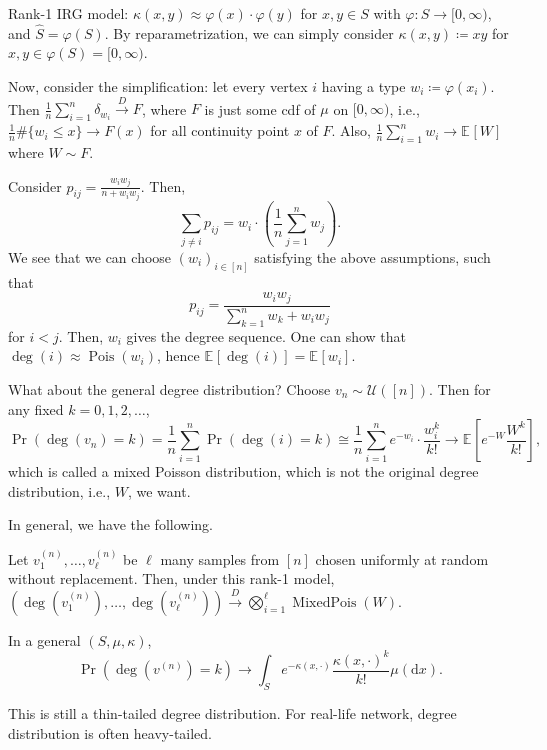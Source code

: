 Rank-1 IRG model: \(\kappa (x, y) \approx \varphi (x) \cdot \varphi (y)\) for \(x, y \in S\) with \(\varphi \colon S \to [0, \infty )\), and \(\hat{S} = \varphi (S)\). By reparametrization, we can simply consider \(\kappa (x, y) \coloneqq xy\) for \(x, y \in \varphi (S) = [0, \infty )\).

Now, consider the simplification: let every vertex \(i\) having a type \(w_i \coloneqq \varphi (x_i)\). Then \(\frac{1}{n}\sum_{i=1}^{n} \delta _{w_i} \overset{D}{\to} F\), where \(F\) is just some cdf of \(\mu \) on \([0, \infty )\), i.e., \(\frac{1}{n}\#\{ w_i \leq x \} \to F(x)\) for all continuity point \(x\) of \(F\). Also, \(\frac{1}{n} \sum_{i=1}^{n} w_i \to \mathbb{E}_{}[W] \) where \(W \sim F\).

Consider \(p_{ij} = \frac{w_i w_j}{n + w_i w_j}\). Then,
\[
	\sum_{j \neq i} p_{ij}
	= w_i \cdot \left( \frac{1}{n}\sum_{j=1}^{n} w_j \right).
\]
We see that we can choose \((w_i)_{i \in [n]}\) satisfying the above assumptions, such that
\[
	p_{ij}
	= \frac{w_i w_j}{\sum_{k=1}^{n} w_k + w_i w_j}
\]
for \(i < j\). Then, \(w_i\) gives the degree sequence. One can show that \(\deg (i) \approx \operatorname{Pois}(w_i) \), hence \(\mathbb{E}_{}[\deg (i)] = \mathbb{E}_{}[w_i] \).

What about the general degree distribution? Choose \(v_n \sim \mathcal{U} ([n])\). Then for any fixed \(k=0, 1, 2, \dots \),
\[
	\Pr_{}\left(\deg (v_n) = k\right)
	= \frac{1}{n} \sum_{i=1}^{n} \Pr_{}\left(\deg (i) = k\right)
	\cong \frac{1}{n} \sum_{i=1}^{n} e^{-w_i} \cdot \frac{w_i^k}{k!}
	\to \mathbb{E}_{}\left[ e^{-W} \frac{W^k}{k!} \right] ,
\]
which is called a mixed Poisson distribution, which is not the original degree distribution, i.e., \(W\), we want.

In general, we have the following.

\begin{theorem}
	Let \(v_1^{(n)}, \dots , v_{\ell }^{(n)} \) be \(\ell \) many samples from \([n]\) chosen uniformly at random without replacement. Then, under this rank-1 model, \((\deg (v_1^{(n)}), \dots , \deg (v_{\ell } ^{(n)})) \overset{D}{\to} \bigotimes _{i=1}^{\ell} \operatorname{MixedPois}(W) \).
\end{theorem}

In a general \((S, \mu , \kappa )\),
\[
	\Pr_{}\left(\deg (v^{(n)}) = k\right)
	\to \int _S e^{-\kappa (x, \cdot)} \frac{\kappa (x, \cdot)^k}{k!} \mu (\mathrm{d} x).
\]
\begin{remark}
	This is still a thin-tailed degree distribution. For real-life network, degree distribution is often heavy-tailed.
\end{remark}

